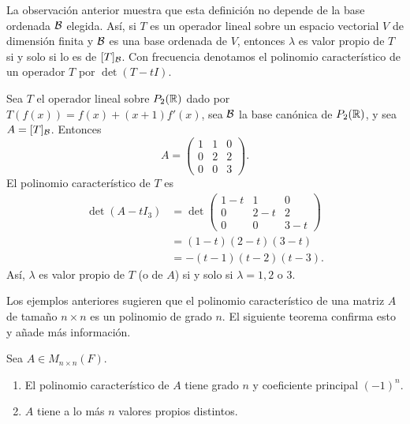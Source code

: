 \documentclass[12pt,a4paper]{book}
\begin{document}
    La observación anterior muestra que esta definición no depende de la base ordenada $\mathcal{B}$ elegida. Así, si $T$ es un operador lineal sobre un espacio vectorial $V$ de dimensión finita y $\mathcal{B}$ es una base ordenada de $V$, entonces $\lambda$ es valor propio de $T$ si y solo si lo es de $[T]_{\mathcal{B}}$. Con frecuencia denotamos el polinomio característico de un operador $T$ por $\det(T - tI)$.

    \begin{ejemplo}
        Sea $T$ el operador lineal sobre $P_2(\mathbb{R})$ dado por $T(f(x)) = f(x) + (x+1)f'(x)$, sea $\mathcal{B}$ la base canónica de $P_2(\mathbb{R})$, y sea $A = [T]_{\mathcal{B}}$. Entonces
        \begin{equation*}
            A = \begin{pmatrix} 1 & 1 & 0 \\ 0 & 2 & 2 \\ 0 & 0 & 3 \end{pmatrix}.
        \end{equation*}
        El polinomio característico de $T$ es
        \begin{align*}
            \det(A - tI_3) &= \det\begin{pmatrix} 1-t & 1 & 0 \\ 0 & 2-t & 2 \\ 0 & 0 & 3-t \end{pmatrix} \\
            &= (1-t)(2-t)(3-t) \\
            &= -(t-1)(t-2)(t-3).
        \end{align*}
        Así, $\lambda$ es valor propio de $T$ (o de $A$) si y solo si $\lambda = 1, 2$ o $3$.
    \end{ejemplo}

    Los ejemplos anteriores sugieren que el polinomio característico de una matriz $A$ de tamaño $n \times n$ es un polinomio de grado $n$. El siguiente teorema confirma esto y añade más información.

    \begin{teorema}
        Sea $A \in M_{n\times n}(F)$.
        \begin{enumerate}[label=(\alph*)]
            \item El polinomio característico de $A$ tiene grado $n$ y coeficiente principal $(-1)^n$.
            \item $A$ tiene a lo más $n$ valores propios distintos.
        \end{enumerate}
    \end{teorema}
\end{document}
